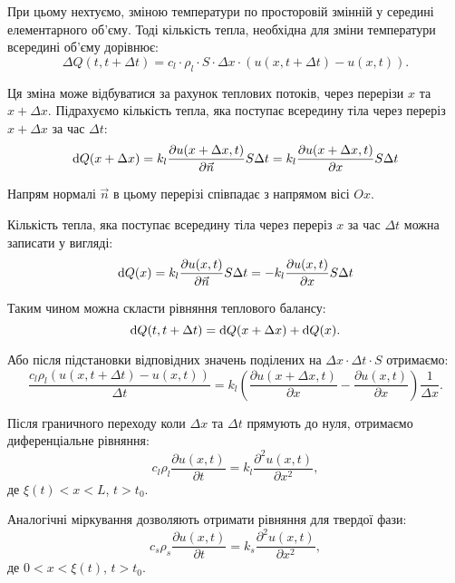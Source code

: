 При цьому нехтуємо, зміною температури по просторовій змінній у середині елементарного об'єму. Тоді кількість тепла, необхідна для зміни температури всередині об'єму дорівнює:
\begin{equation}
	\Delta Q(t, t + \Delta t) = c_l \cdot \rho_l \cdot S \cdot \Delta x \cdot (u(x, t + \Delta t) - u(x, t)).
\end{equation}

Ця зміна може відбуватися за рахунок теплових потоків, через перерізи $x$ та $x + \Delta x$. Підрахуємо кількість тепла, яка поступає всередину тіла через переріз $x + \Delta x$ за час $\Delta t$:
\begin{equation}
	\mathop{}\!\mathrm{d} Q(x + \Delta x) = k_l \frac{\partial u(x + \Delta x, t)}{\partial \vec n} S \Delta t= k_l \frac{\partial u(x + \Delta x, t)}{\partial x} S \Delta t
\end{equation} 
 
Напрям нормалі $\vec n$ в цьому перерізі співпадає з напрямом вісі $Ox$. \medskip

Кількість тепла, яка поступає всередину тіла через переріз $x$ за час $\Delta t$ можна записати у вигляді:
\begin{equation}
	\mathop{}\!\mathrm{d} Q(x) = k_l \frac{\partial u(x, t)}{\partial \vec n} S \Delta t = - k_l \frac{\partial u(x, t)}{\partial x} S \Delta t
\end{equation} 

Таким чином можна скласти рівняння теплового балансу:
\begin{equation}
	\mathop{}\!\mathrm{d} Q(t, t + \Delta t) = \mathop{}\!\mathrm{d} Q(x + \Delta x) + \mathop{}\!\mathrm{d} Q(x).
\end{equation}
 
Або після підстановки відповідних значень поділених на $\Delta x \cdot \Delta t \cdot S$ отримаємо:
\begin{equation}
	\frac{c_l \rho_l (u(x, t + \Delta t) - u(x, t))}{\Delta t} = k_l \left( \frac{\partial u(x + \Delta x, t)}{\partial x} - \frac{\partial u(x, t)}{\partial x} \right) \frac{1}{\Delta x}.
\end{equation}
 
Після граничного переходу коли $\Delta x$ та $\Delta t$ прямують до нуля, отримаємо диференціальне рівняння:
\begin{equation}
	\label{eq:liquid-phase-diff-eq}
	c_l \rho_l \frac{\partial u(x, t)}{\partial t} = k_l \frac{\partial^2 u(x, t)}{\partial x^2},
\end{equation}
де $\xi(t) < x < L$, $t > t_0$. \medskip

Аналогічні міркування дозволяють отримати рівняння для твердої фази:
\begin{equation}
	\label{eq:solid-phase-diff-eq}
	c_s \rho_s \frac{\partial u(x, t)}{\partial t} = k_s \frac{\partial^2 u(x, t)}{\partial x^2},
\end{equation}
де $0 < x < \xi(t)$, $t > t_0$. \medskip

